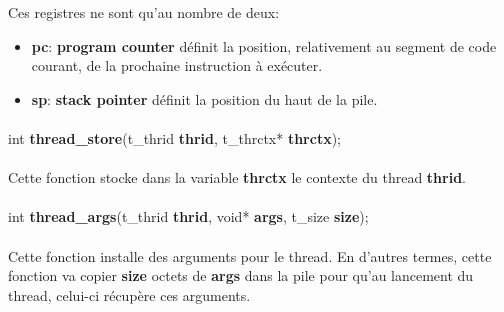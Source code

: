 \documentclass[10pt,a4wide]{article}
\begin{document}
Ces registres ne sont qu'au nombre de deux:

\begin{itemize}

\item \textbf{pc}: \textbf{program counter} d\'efinit la position,
      relativement au segment de code courant, de la prochaine
      instruction \`a ex\'ecuter.

\item \textbf{sp}: \textbf{stack pointer} d\'efinit la position
      du haut de la pile.

\end{itemize}

\paragraph{}

\hspace{1.5cm}int \textbf{thread\_store}(t\_thrid \textbf{thrid},
                                         t\_thrctx* \textbf{thrctx});

\paragraph{}

Cette fonction stocke dans la variable \textbf{thrctx} le contexte
du thread \textbf{thrid}.

\paragraph{}

\hspace{1.5cm}int \textbf{thread\_args}(t\_thrid \textbf{thrid},
                                        void* \textbf{args},
                                        t\_size \textbf{size});

\paragraph{}

Cette fonction installe des arguments pour le thread. En d'autres termes,
cette fonction va copier \textbf{size} octets de \textbf{args} dans la
pile pour qu'au lancement du thread, celui-ci r\'ecup\`ere ces arguments.

\paragraph{}
\end{document}
